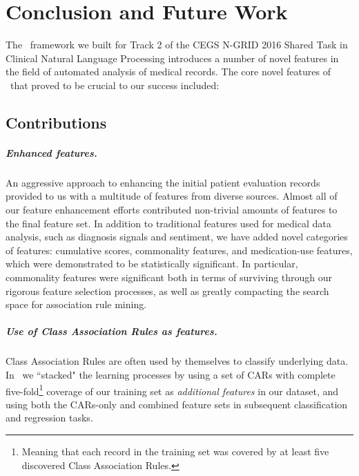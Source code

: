 \chapter{Conclusion and Future Work}\label{sec:conclusion}

The \CREATE\ framework we built for Track 2 of the CEGS N-GRID 2016 Shared Task in Clinical Natural Language Processing introduces a number of novel features in the
field of automated analysis of medical records. The core novel
features of \CREATE\ that proved to be crucial to our success included:

\section{Contributions}

\paragraph{Enhanced features.} An aggressive approach to enhancing the
initial patient evaluation records provided to us with a multitude of features
from diverse sources. Almost all of our feature enhancement efforts 
contributed non-trivial amounts of features to the final feature set. In addition
to traditional features used for medical data analysis, such as diagnosis signals and sentiment, we have added novel categories of features: cumulative scores, commonality
features, and medication-use features, which were demonstrated to be statistically significant. In particular, commonality features were significant both in terms of surviving through our rigorous feature selection processes, as well as greatly compacting the search space for association rule mining. 

\paragraph{Use of Class Association Rules as features.} Class Association Rules
are often used by themselves to classify underlying data. In \CREATE\ we ``stacked"
the learning processes by using a set of CARs with complete five-fold\footnote{Meaning
that each record in the training set was covered by at least five discovered
Class Association Rules.} coverage of our training set as \textit{additional features} 
in our dataset, and using both the CARs-only and combined feature sets in
subsequent classification and regression tasks.

